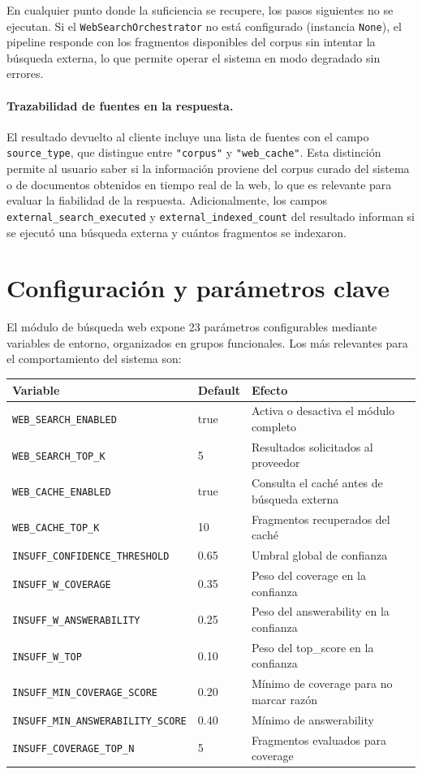 \documentclass[11pt]{article}
\begin{document}
En cualquier punto donde la suficiencia se recupere, los pasos siguientes no se ejecutan. Si
el \texttt{WebSearchOrchestrator} no está configurado (instancia \texttt{None}), el pipeline
responde con los fragmentos disponibles del corpus sin intentar la búsqueda externa, lo que
permite operar el sistema en modo degradado sin errores.

\paragraph{Trazabilidad de fuentes en la respuesta.}
El resultado devuelto al cliente incluye una lista de fuentes con el campo
\texttt{source\_type}, que distingue entre \texttt{"corpus"} y \texttt{"web\_cache"}. Esta
distinción permite al usuario saber si la información proviene del corpus curado del sistema o
de documentos obtenidos en tiempo real de la web, lo que es relevante para evaluar la
fiabilidad de la respuesta. Adicionalmente, los campos \texttt{external\_search\_executed} y
\texttt{external\_indexed\_count} del resultado informan si se ejecutó una búsqueda externa y
cuántos fragmentos se indexaron.

\section{Configuración y parámetros clave}

El módulo de búsqueda web expone 23 parámetros configurables mediante variables de entorno,
organizados en grupos funcionales. Los más relevantes para el comportamiento del sistema son:

\begin{center}
\begin{tabular}{lll}
\toprule
\textbf{Variable} & \textbf{Default} & \textbf{Efecto} \\
\midrule
\texttt{WEB\_SEARCH\_ENABLED} & true & Activa o desactiva el módulo completo \\
\texttt{WEB\_SEARCH\_TOP\_K} & 5 & Resultados solicitados al proveedor \\
\texttt{WEB\_CACHE\_ENABLED} & true & Consulta el caché antes de búsqueda externa \\
\texttt{WEB\_CACHE\_TOP\_K} & 10 & Fragmentos recuperados del caché \\
\texttt{INSUFF\_CONFIDENCE\_THRESHOLD} & 0.65 & Umbral global de confianza \\
\texttt{INSUFF\_W\_COVERAGE} & 0.35 & Peso del coverage en la confianza \\
\texttt{INSUFF\_W\_ANSWERABILITY} & 0.25 & Peso del answerability en la confianza \\
\texttt{INSUFF\_W\_TOP} & 0.10 & Peso del top\_score en la confianza \\
\texttt{INSUFF\_MIN\_COVERAGE\_SCORE} & 0.20 & Mínimo de coverage para no marcar razón \\
\texttt{INSUFF\_MIN\_ANSWERABILITY\_SCORE} & 0.40 & Mínimo de answerability \\
\texttt{INSUFF\_COVERAGE\_TOP\_N} & 5 & Fragmentos evaluados para coverage \\
\bottomrule
\end{tabular}
\end{center}
\end{document}
